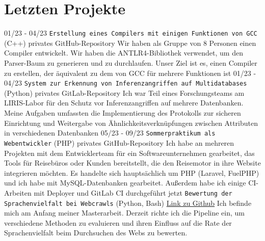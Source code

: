 \documentclass[oneside]{friggeri-cv}
\begin{document}
\section{Letzten Projekte}
\begin{entrylist}
\vspace{0.15cm} 
  \entry
    {01/23 - 04/23}
    {\texttt{Erstellung eines Compilers mit einigen Funktionen von GCC} (C++)}
    {privates GitHub-Repository \vspace{0.1cm}}
    {Wir haben als Gruppe von 8 Personen einen Compiler entwickelt. Wir haben die ANTLR4-Bibliothek verwendet, um den Parser-Baum zu generieren und zu durchlaufen. Unser Ziel ist es, einen Compiler zu erstellen, der äquivalent zu dem von GCC für mehrere Funktionen ist}  
\vspace{0.15mm} 
  \entry
    {01/23 - 04/23}
    {\texttt{System zur Erkennung von Inferenzangriffen auf Multidatabases} (Python)  \vspace{0.1cm}}
    {privates GitLab-Repository}
    {Ich war Teil eines Forschungsteams am LIRIS-Labor für den Schutz vor Inferenzangriffen auf mehrere Datenbanken. Meine Aufgaben umfassten die Implementierung des Protokolls zur sicheren Einrichtung und Weitergabe von Ähnlichkeitsverknüpfungen zwischen Attributen in verschiedenen Datenbanken}           
\vspace{0.15mm} 
  \entry
    {05/23 - 09/23}
    {\texttt{Sommerpraktikum als Webentwickler} (PHP)}
    {privates GitHub-Repository \vspace{0.1cm}}
    {Ich habe an mehreren Projekten mit dem Entwicklerteam für ein Softwareunternehmen gearbeitet, das Tools für Reisebüros oder Kunden bereitstellt, die den Reisemotor in ihre Website integrieren möchten. Es handelte sich hauptsächlich um PHP (Laravel, FuelPHP) und ich habe mit MySQL-Datenbanken gearbeitet. Außerdem habe ich einige CI-Arbeiten mit Deployer und GitLab CI durchgeführt}           
  \entry
    {jetzt}
    {\texttt{Bewertung der Sprachenvielfalt bei Webcrawls} (Python, Bash)}
    {\href{https://github.com/medkhabt/Language_diversity_common_crawler}{Link zu Github}}
    {Ich befinde mich am Anfang meiner Masterarbeit. Derzeit richte ich die Pipeline ein, um verschiedene Methoden zu evaluieren und ihren Einfluss auf die Rate der Sprachenvielfalt beim Durchsuchen des Webs zu bewerten.}    
\end{entrylist}
\end{document}
